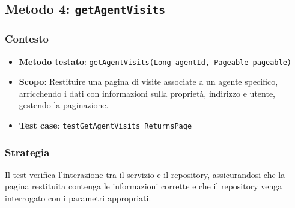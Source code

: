 \documentclass{book}
\begin{document}
\subsection{Metodo 4: \texttt{getAgentVisits}}

\subsubsection{Contesto}
\begin{itemize}
\item \textbf{Metodo testato}: \texttt{getAgentVisits(Long agentId, Pageable pageable)}
\item \textbf{Scopo}: Restituire una pagina di visite associate a un agente specifico, arricchendo i dati con informazioni sulla proprietà, indirizzo e utente, gestendo la paginazione.
\item \textbf{Test case}: \texttt{testGetAgentVisits\_ReturnsPage}
\end{itemize}

\subsubsection{Strategia}
Il test verifica l’interazione tra il servizio e il repository, assicurandosi che la pagina restituita contenga le informazioni corrette e che il repository venga interrogato con i parametri appropriati.
\end{document}
